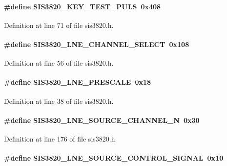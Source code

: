 \paragraph[{SIS3820\_\-KEY\_\-TEST\_\-PULS}]{\setlength{\rightskip}{0pt plus 5cm}\#define SIS3820\_\-KEY\_\-TEST\_\-PULS~0x408}\hfill\label{sis3820_8h_aaeab90f4a61c5bb069e70fdbc38cdfbc}


Definition at line 71 of file sis3820.h.
\paragraph[{SIS3820\_\-LNE\_\-CHANNEL\_\-SELECT}]{\setlength{\rightskip}{0pt plus 5cm}\#define SIS3820\_\-LNE\_\-CHANNEL\_\-SELECT~0x108}\hfill\label{sis3820_8h_aca9388f7ad13f72fb21efc35af0601cd}


Definition at line 56 of file sis3820.h.
\paragraph[{SIS3820\_\-LNE\_\-PRESCALE}]{\setlength{\rightskip}{0pt plus 5cm}\#define SIS3820\_\-LNE\_\-PRESCALE~0x18}\hfill\label{sis3820_8h_a1b7414d561af06346ddd205373be2870}


Definition at line 38 of file sis3820.h.
\paragraph[{SIS3820\_\-LNE\_\-SOURCE\_\-CHANNEL\_\-N}]{\setlength{\rightskip}{0pt plus 5cm}\#define SIS3820\_\-LNE\_\-SOURCE\_\-CHANNEL\_\-N~0x30}\hfill\label{sis3820_8h_ae7b77d8b6979ed0871058bdefdabe355}


Definition at line 176 of file sis3820.h.
\paragraph[{SIS3820\_\-LNE\_\-SOURCE\_\-CONTROL\_\-SIGNAL}]{\setlength{\rightskip}{0pt plus 5cm}\#define SIS3820\_\-LNE\_\-SOURCE\_\-CONTROL\_\-SIGNAL~0x10}\hfill\label{sis3820_8h_a791b01d8a0df39ef35aea8c0990e73ca}



